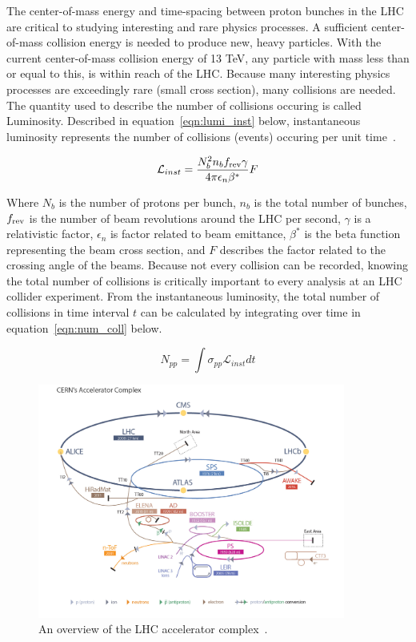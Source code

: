 The center-of-mass energy and time-spacing between proton bunches in the LHC are critical to studying interesting
and rare physics processes. A sufficient center-of-mass collision energy is needed to produce new, heavy particles.
With the current center-of-mass collision energy of 13 TeV, any particle with mass less than or equal to this, is 
within reach of the LHC. Because many interesting physics processes are exceedingly rare (small cross section), many collisions
are needed. The quantity used to describe the number of collisions occuring is called Luminosity.
Described in equation~\ref{eqn:lumi_inst} below, instantaneous luminosity represents the number of collisions (events) occuring per unit time~\cite{lhc_bluebook}.

\begin{equation}
\label{eqn:lumi_inst}
\mathcal{L}_{inst} = \frac{N_{b}^{2}n_{b}f_{\textnormal{rev}}\gamma}{4\pi \epsilon_{n} \beta^{*}}F
\end{equation}

Where $N_{b}$ is the number of protons per bunch, $n_{b}$ is the total number of bunches, $f_{\textnormal{rev}}$ is the number of beam revolutions around the LHC per
second, $\gamma$ is a relativistic factor, $\epsilon_{n}$ is factor related to beam emittance, $\beta^{*}$ is the beta function representing the beam cross section, and
$F$ describes the factor related to the crossing angle of the beams. Because not every collision can be recorded, knowing the total number of collisions is critically important
to every analysis at an LHC collider experiment. From the instantaneous luminosity, the total number of collisions in time interval $t$ can be calculated by integrating over time
in equation~\ref{eqn:num_coll} below. 

\begin{equation}
\label{eqn:num_coll}
N_{pp} = \int \sigma_{pp}\mathcal{L}_{inst}dt 
\end{equation}


\begin{figure}[hbtp]
 \begin{center}
   \includegraphics[width=0.9\textwidth]{ch3_figs/lhc_complex.pdf}
   \caption{An overview of the LHC accelerator complex~\cite{lhcfig}.}
   \label{fig:lhc_complex}
 \end{center}
\end{figure}


